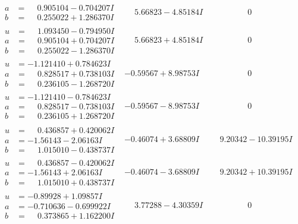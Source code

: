 \documentclass[1p]{elsarticle_modified}
\theoremstyle{definition}
\begin{document}
$$\begin{array}{c|c|c}
\begin{aligned}
a &= \phantom{-}0.905104 - 0.704207 I \\
b &= \phantom{-}0.255022 + 1.286370 I\end{aligned}
 & \phantom{-}5.66823 - 4.85184 I & \phantom{-0.000000 } 0 \\ \hline\begin{aligned}
u &= \phantom{-}1.093450 - 0.794950 I \\
a &= \phantom{-}0.905104 + 0.704207 I \\
b &= \phantom{-}0.255022 - 1.286370 I\end{aligned}
 & \phantom{-}5.66823 + 4.85184 I & \phantom{-0.000000 } 0 \\ \hline\begin{aligned}
u &= -1.121410 + 0.784623 I \\
a &= \phantom{-}0.828517 + 0.738103 I \\
b &= \phantom{-}0.236105 - 1.268720 I\end{aligned}
 & -0.59567 + 8.98753 I & \phantom{-0.000000 } 0 \\ \hline\begin{aligned}
u &= -1.121410 - 0.784623 I \\
a &= \phantom{-}0.828517 - 0.738103 I \\
b &= \phantom{-}0.236105 + 1.268720 I\end{aligned}
 & -0.59567 - 8.98753 I & \phantom{-0.000000 } 0 \\ \hline\begin{aligned}
u &= \phantom{-}0.436857 + 0.420062 I \\
a &= -1.56143 - 2.06163 I \\
b &= \phantom{-}1.015010 - 0.438737 I\end{aligned}
 & -0.46074 + 3.68809 I & \phantom{-}9.20342 - 10.39195 I \\ \hline\begin{aligned}
u &= \phantom{-}0.436857 - 0.420062 I \\
a &= -1.56143 + 2.06163 I \\
b &= \phantom{-}1.015010 + 0.438737 I\end{aligned}
 & -0.46074 - 3.68809 I & \phantom{-}9.20342 + 10.39195 I \\ \hline\begin{aligned}
u &= -0.89928 + 1.09857 I \\
a &= -0.710636 - 0.699922 I \\
b &= \phantom{-}0.373865 + 1.162200 I\end{aligned}
 & \phantom{-}3.77288 - 4.30359 I & \phantom{-0.000000 } 0\\

\end{array}$$
\end{document}
